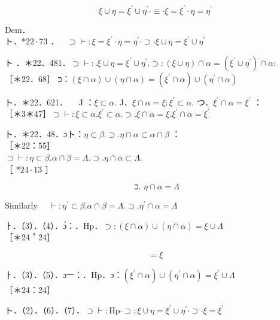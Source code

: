 \documentclass[10pt]{article}
\begin{document}
\begin{equation*}
\xi \cup \eta=\xi^{\prime} \cup \eta^{\prime} \cdot \equiv \cdot \xi=\xi^{\prime} \cdot \eta=\eta^{\prime} \tag{1}
\end{equation*}


Dem．\\
ト．$* 22 \cdot 73$ ．$\quad \supset \vdash: \xi=\xi^{\prime} \cdot \eta=\eta^{\prime} \cdot \supset \cdot \xi \cup \eta=\xi^{\prime} \cup \eta^{\prime}$

ト ．＊22．481．$\supset \vdash: . \xi \cup \eta=\xi^{\prime} \cup \eta^{\prime} . \supset:(\xi \cup \eta) \cap \alpha=\left(\xi^{\prime} \cup \eta^{\prime}\right) \cap \alpha:$\\
［＊22．68］ כ：$(\xi \cap \alpha) \cup(\eta \cap \alpha)=\left(\xi^{\prime} \cap \alpha\right) \cup\left(\eta^{\prime} \cap \alpha\right)$

ト．＊22．621．$\quad$ J ：$\xi \subset \alpha$. J．$\xi \cap \alpha=\xi: \xi^{\prime} \subset \alpha$. つ．$\xi^{\prime} \cap \alpha=\xi^{\prime}$ ：\\
［＊3＊47］$\supset \vdash: \xi \subset \alpha . \xi^{\prime} \subset \alpha . \supset . \xi \cap \alpha=\xi . \xi^{\prime} \cap \alpha=\xi^{\prime}$

ト．＊22．48．ɔト：$\eta \subset \beta . \supset . \eta \cap \alpha \subset \alpha \cap \beta$ ：\\
［＊22：55］\\
$\supset \vdash: \eta \subset \beta . \alpha \cap \beta=\Lambda . \supset . \eta \cap \alpha \subset \Lambda$.\\
［ $* 24 \cdot 13$ ］


\begin{equation*}
\text { כ. } \eta \cap \alpha=\Lambda \tag{4}
\end{equation*}


Similarly $\quad \vdash: \eta^{\prime} \subset \beta . \alpha \cap \beta=\Lambda . \supset . \eta^{\prime} \cap \alpha=\Lambda$

ㅏ．（3）．（4）．ɔํ：．Hp．$\supset:(\xi \cap \alpha) \cup(\eta \cap \alpha)=\xi \cup \Lambda$\\
［＊24＇24］

$$
=\xi
$$

ㅏ．（3）．（5）．ɔㅡ：．Hp．ɔ：$\left(\xi^{\prime} \cap \alpha\right) \cup\left(\eta^{\prime} \cap \alpha\right)=\xi^{\prime} \cup \Lambda$\\
［＊24：24］

ト．（2）．（6）．（7）．$\supset \vdash: \mathrm{Hp} \cdot \supset: \xi \cup \eta=\xi^{\prime} \cup \eta^{\prime} \cdot \supset \cdot \xi=\xi^{\prime}$
\end{document}
